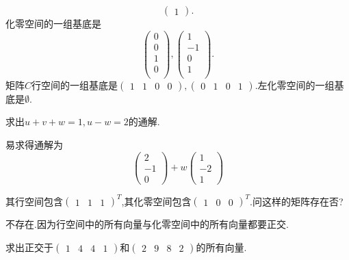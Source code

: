 ﻿\documentclass{book} \usepackage{exsheets} \usepackage{xeCJK}
\begin{document}
\begin{solution}
\begin{itemize}
$$\begin{pmatrix}
  1
\end{pmatrix}.
$$化零空间的一组基底是
$$
\begin{pmatrix}
  0\\
  0\\
  1\\
  0\\
\end{pmatrix},
\begin{pmatrix}
  1\\
  -1\\
  0\\
  1\\
\end{pmatrix}.
$$矩阵$C$行空间的一组基底是$
\begin{pmatrix}
  1&1&0&0
\end{pmatrix},
\begin{pmatrix}
  0&1&0&1
\end{pmatrix}.  $左化零空间的一组基底是$\emptyset$.
\end{itemize}
\end{solution}
\begin{question}
  求出$u+v+w=1,u-w=2$的通解.
\end{question}
\begin{solution}
  易求得通解为
$$
\begin{pmatrix}
  2\\
  -1\\
  0
\end{pmatrix}+w
\begin{pmatrix}
  1\\
  -2\\
  1
\end{pmatrix}
$$
\end{solution}
\begin{question}
  其行空间包含$
  \begin{pmatrix}
    1&1&1
  \end{pmatrix}^T $,其化零空间包含$
  \begin{pmatrix}
    1&0&0
  \end{pmatrix}^T $.问这样的矩阵存在否?
\end{question}
\begin{solution}
  不存在.因为行空间中的所有向量与化零空间中的所有向量都要正交.
\end{solution}
\begin{question}
  求出正交于$
  \begin{pmatrix}
    1&4&4&1
  \end{pmatrix}
  $和$
  \begin{pmatrix}
    2&9&8&2
  \end{pmatrix}
  $的所有向量.
\end{question}
\end{document}
